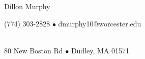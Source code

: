 \documentclass[12pt,notitlepage]{article}
\newenvironment{rhead}
	{\fontfamily{\sfdefault}\selectfont\noindent}
	{\par}
\begin{document}
\begin{rhead}
	\begin{Large}Dillon Murphy\end{Large}
	\hfill (774) 303-2828 $\bullet$
	dmurphy10@worcester.edu
\end{rhead}
	\noindent \hrulefill\\
\begin{rhead}
	\phantom{}\hfill 80 New Boston Rd $\bullet$
	Dudley, MA 01571 \\
\end{rhead}
\end{document}
